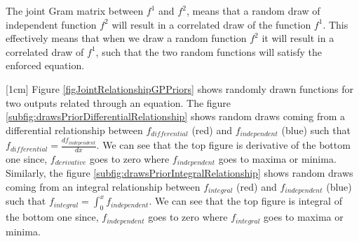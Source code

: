 The joint Gram matrix between \(f^{1}\) and \(f^{2}\), means that a random draw of independent function \(f^{2}\) will result in a correlated draw of the function \(f^{1}\). This effectively means that when we draw a random function \(f^{2}\) it will result in a correlated draw of \(f^{1}\), such that the two random functions will satisfy the enforced equation. 

[1cm]
Figure \ref{figJointRelationshipGPPriors} shows randomly drawn functions for two outputs related through an equation. The figure  \ref{subfig:drawsPriorDifferentialRelationship} shows random draws coming from a differential relationship between \(f_{differential}\) (red) and \(f_{independent}\) (blue) such that \(f_{differential} = \frac{d f_{independent}}{d x}\). We can see that the top figure is derivative of the bottom one since, \(f_{derivative}\) goes to zero where \(f_{independent}\) goes to maxima or minima. Similarly, the figure \ref{subfig:drawsPriorIntegralRelationship} shows random draws coming from an integral relationship between \(f_{integral}\) (red) and \(f_{independent}\) (blue) such that \(f_{integral} = \int_{0}^x f_{independent}\). We can see that the top figure is integral of the bottom one since, \(f_{independent}\) goes to zero where \(f_{integral}\) goes to maxima or minima. 

